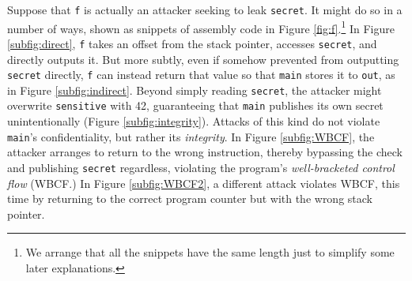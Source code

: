 \documentclass[10pt,conference]{ieeetran}%
\theoremstyle{definition}
\begin{document}
Suppose that {\tt f} is actually an attacker seeking
to leak {\tt secret}. It might do so in a number of ways, shown as snippets of
assembly code in Figure \ref{fig:f}.\footnote{We arrange that all the snippets
have the same length just to simplify some later explanations.}
%
In Figure \ref{subfig:direct}, {\tt f} takes an offset from the stack
pointer, accesses {\tt secret}, and directly outputs it. But more
subtly, even if somehow prevented from outputting {\tt secret} directly, {\tt f}
can instead return that value so that {\tt main} stores it to {\tt out},
as in Figure \ref{subfig:indirect}.
%
Beyond simply reading {\tt secret}, the attacker might overwrite {\tt sensitive}
with 42, guaranteeing that {\tt main} publishes its own secret unintentionally
(Figure \ref{subfig:integrity}).
Attacks of this kind do not violate {\tt main}'s confidentiality, but
rather its {\it integrity}.
In Figure \ref{subfig:WBCF}, the attacker arranges to return to the
wrong instruction, thereby bypassing the check and publishing {\tt secret} regardless,
violating the program's {\it well-bracketed control flow} (WBCF.) In
Figure \ref{subfig:WBCF2}, a different attack violates WBCF, this time
by returning to the correct program counter but with the wrong stack pointer.
\end{document}

